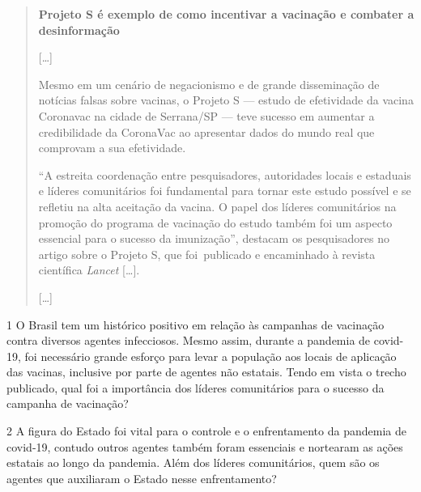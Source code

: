 \begin{quote}
\textbf{Projeto S é exemplo de como incentivar a vacinação e combater a desinformação}

{[}\ldots{}{]}

Mesmo em um cenário de negacionismo e de grande disseminação de notícias
falsas sobre vacinas, o Projeto S --- estudo de efetividade da vacina
Coronavac na cidade de Serrana/SP --- teve sucesso em aumentar a
credibilidade da CoronaVac ao apresentar dados do mundo real que
comprovam a sua efetividade.

``A estreita coordenação entre pesquisadores, autoridades locais e
estaduais e líderes comunitários foi fundamental para tornar este estudo
possível e se refletiu na alta aceitação da vacina. O papel dos líderes
comunitários na promoção do programa de vacinação do estudo também foi
um aspecto essencial para o sucesso da imunização'', destacam os
pesquisadores no artigo sobre o Projeto S, que foi~publicado e
encaminhado à revista científica \emph{Lancet} {[}\ldots{}{]}.

{[}\ldots{}{]}

\end{quote}

\num{1} O Brasil tem um histórico positivo em relação às campanhas de
vacinação contra diversos agentes infecciosos. Mesmo assim, durante a
pandemia de covid-19, foi necessário grande esforço para levar a
população aos locais de aplicação das vacinas, inclusive por parte de
agentes não estatais. Tendo em vista o trecho publicado, qual foi a
importância dos líderes comunitários para o sucesso da campanha de
vacinação?


\num{2} A figura do Estado foi vital para o controle e o enfrentamento
da pandemia de covid-19, contudo outros agentes também foram essenciais
e nortearam as ações estatais ao longo da pandemia. Além dos líderes
comunitários, quem são os agentes que auxiliaram o Estado nesse
enfrentamento?


